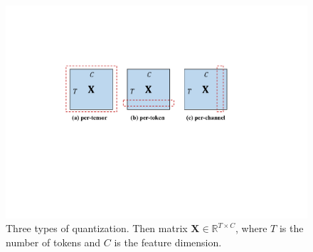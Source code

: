  \begin{figure}[t]
    \centering
    \includegraphics[width=0.88\linewidth]{figures/kv_quant.pdf}
    \caption{Three types of quantization. Then matrix $\mathbf{X} \in \mathbb{R}^{T\times C}$, where $T$ is the number of tokens and $C$ is the feature dimension.}
    \label{fig:kv_quant}
\end{figure}



